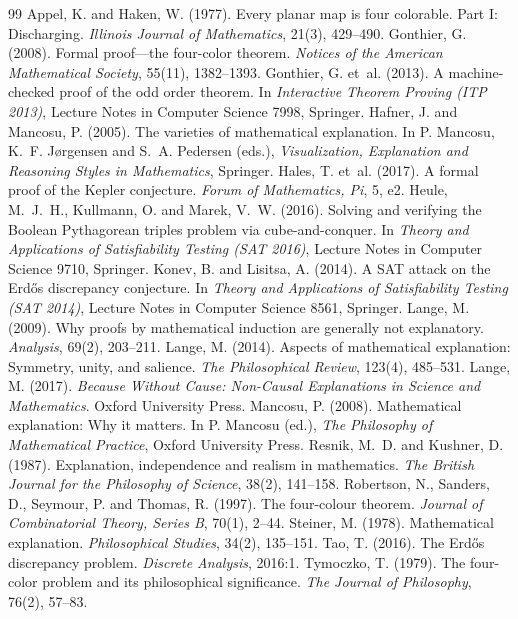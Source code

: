 \documentclass{situationist-preprint}
\begin{document}
\begin{thebibliography}{99}\small
{} Appel, K. and Haken, W. (1977). Every planar map is four colorable. Part I: Discharging. \emph{Illinois Journal of Mathematics}, 21(3), 429--490.
 Gonthier, G. (2008). Formal proof---the four-color theorem. \emph{Notices of the American Mathematical Society}, 55(11), 1382--1393.
 Gonthier, G. et~al. (2013). A machine-checked proof of the odd order theorem. In \emph{Interactive Theorem Proving (ITP 2013)}, Lecture Notes in Computer Science 7998, Springer.
 Hafner, J. and Mancosu, P. (2005). The varieties of mathematical explanation. In P. Mancosu, K.~F. J{\o}rgensen and S.~A. Pedersen (eds.), \emph{Visualization, Explanation and Reasoning Styles in Mathematics}, Springer.
 Hales, T. et~al. (2017). A formal proof of the Kepler conjecture. \emph{Forum of Mathematics, Pi}, 5, e2.
 Heule, M.~J.~H., Kullmann, O. and Marek, V.~W. (2016). Solving and verifying the Boolean Pythagorean triples problem via cube-and-conquer. In \emph{Theory and Applications of Satisfiability Testing (SAT 2016)}, Lecture Notes in Computer Science 9710, Springer.
 Konev, B. and Lisitsa, A. (2014). A SAT attack on the Erd\H{o}s discrepancy conjecture. In \emph{Theory and Applications of Satisfiability Testing (SAT 2014)}, Lecture Notes in Computer Science 8561, Springer.
 Lange, M. (2009). Why proofs by mathematical induction are generally not explanatory. \emph{Analysis}, 69(2), 203--211.
 Lange, M. (2014). Aspects of mathematical explanation: Symmetry, unity, and salience. \emph{The Philosophical Review}, 123(4), 485--531.
 Lange, M. (2017). \emph{Because Without Cause: Non-Causal Explanations in Science and Mathematics}. Oxford University Press.
 Mancosu, P. (2008). Mathematical explanation: Why it matters. In P. Mancosu (ed.), \emph{The Philosophy of Mathematical Practice}, Oxford University Press.
 Resnik, M.~D. and Kushner, D. (1987). Explanation, independence and realism in mathematics. \emph{The British Journal for the Philosophy of Science}, 38(2), 141--158.
 Robertson, N., Sanders, D., Seymour, P. and Thomas, R. (1997). The four-colour theorem. \emph{Journal of Combinatorial Theory, Series B}, 70(1), 2--44.
 Steiner, M. (1978). Mathematical explanation. \emph{Philosophical Studies}, 34(2), 135--151.
 Tao, T. (2016). The Erd\H{o}s discrepancy problem. \emph{Discrete Analysis}, 2016:1.
 Tymoczko, T. (1979). The four-color problem and its philosophical significance. \emph{The Journal of Philosophy}, 76(2), 57--83.
\end{thebibliography}
\end{document}
